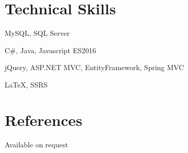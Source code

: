 \documentclass[10pt,a4paper]{moderncv}
\begin{document}
    \section{Technical Skills}
    {MySQL, SQL Server}
    {}
    {}

    {C\#, Java, Javascript ES2016}
    {}
    {}

    {jQuery, ASP.NET MVC, EntityFramework, Spring MVC}
    {}
    {}

    {LaTeX, SSRS}
    {}
    {}

    \section{References}
    \qquad \qquad \qquad \quad Available on request
\end{document}
